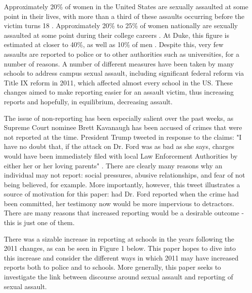 \documentclass[AER,draftmode]{AEA}
\begin{document}

\clearpage
Approximately 20\% of women in the United States are sexually assaulted at some point in their lives, with more than a third of these assaults occurring before the victim turns 18 \cite{black_national_2011}. Approximately 20\% to 25\% of women nationally are sexually assaulted at some point during their college careers \cite{fisher_sexual_2000}. At Duke, this figure is estimated at closer to 40\%, as well as 10\% of men \cite{fox_university_2017} . Despite this, very few assaults are reported to police or to other authorities such as universities, for a number of reasons. A number of different measures have been taken by many schools to address campus sexual assault, including significant federal reform via Title IX reform in 2011, which affected almost every school in the US. These changes aimed to make reporting easier for an assault victim, thus increasing reports and hopefully, in equilibrium, decreasing assault.

The issue of non-reporting has been especially salient over the past weeks, as Supreme Court nominee Brett Kavanaugh has been accused of crimes that were not reported at the time. President Trump tweeted in response to the claims: "I have no doubt that, if the attack on Dr. Ford was as bad as she says, charges would have been immediately filed with local Law Enforcement Authorities by either her or her loving parents" \citeyear{trump_i_2018}. There are clearly many reasons why an individual may not report: social pressures, abusive relationships, and fear of not being believed, for example. More importantly, however, this tweet illustrates a source of motivation for this paper: had Dr. Ford reported when the crime had been committed, her testimony now would be more impervious to detractors. There are many reasons that increased reporting would be a desirable outcome - this is just one of them. 

There was a sizable increase in reporting at schools in the years following the 2011 changes, as can be seen in Figure 1 below. This paper hopes to dive into this increase and consider the different ways in which 2011 may have increased reports both to police and to schools. More generally, this paper seeks to investigate the link between discourse around sexual assault and reporting of sexual assault. 
\end{document}
